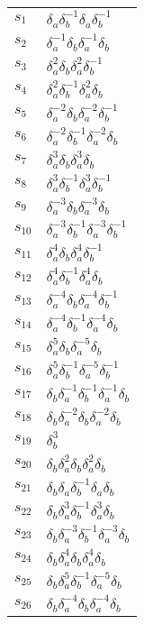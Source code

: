 \documentclass{article}
\begin{document}
\begin{center}
\begin{tabular}{ll}
\midrule
$s_{1}$ & $\delta_a^{}\delta_b^{-1}\delta_a^{}\delta_b^{-1}$ \\
$s_{2}$ & $\delta_a^{-1}\delta_b^{}\delta_a^{-1}\delta_b^{}$ \\
$s_{3}$ & $\delta_a^{2}\delta_b^{}\delta_a^{2}\delta_b^{-1}$ \\
$s_{4}$ & $\delta_a^{2}\delta_b^{-1}\delta_a^{2}\delta_b^{}$ \\
$s_{5}$ & $\delta_a^{-2}\delta_b^{}\delta_a^{-2}\delta_b^{-1}$ \\
$s_{6}$ & $\delta_a^{-2}\delta_b^{-1}\delta_a^{-2}\delta_b^{}$ \\
$s_{7}$ & $\delta_a^{3}\delta_b^{}\delta_a^{3}\delta_b^{}$ \\
$s_{8}$ & $\delta_a^{3}\delta_b^{-1}\delta_a^{3}\delta_b^{-1}$ \\
$s_{9}$ & $\delta_a^{-3}\delta_b^{}\delta_a^{-3}\delta_b^{}$ \\
$s_{10}$ & $\delta_a^{-3}\delta_b^{-1}\delta_a^{-3}\delta_b^{-1}$ \\
$s_{11}$ & $\delta_a^{4}\delta_b^{}\delta_a^{4}\delta_b^{-1}$ \\
$s_{12}$ & $\delta_a^{4}\delta_b^{-1}\delta_a^{4}\delta_b^{}$ \\
$s_{13}$ & $\delta_a^{-4}\delta_b^{}\delta_a^{-4}\delta_b^{-1}$ \\
$s_{14}$ & $\delta_a^{-4}\delta_b^{-1}\delta_a^{-4}\delta_b^{}$ \\
$s_{15}$ & $\delta_a^{5}\delta_b^{}\delta_a^{-5}\delta_b^{}$ \\
$s_{16}$ & $\delta_a^{5}\delta_b^{-1}\delta_a^{-5}\delta_b^{-1}$ \\
$s_{17}$ & $\delta_b^{}\delta_a^{-1}\delta_b^{-1}\delta_a^{-1}\delta_b^{}$ \\
$s_{18}$ & $\delta_b^{}\delta_a^{-2}\delta_b^{}\delta_a^{-2}\delta_b^{}$ \\
$s_{19}$ & $\delta_b^{3}$ \\
$s_{20}$ & $\delta_b^{}\delta_a^{2}\delta_b^{}\delta_a^{2}\delta_b^{}$ \\
$s_{21}$ & $\delta_b^{}\delta_a^{}\delta_b^{-1}\delta_a^{}\delta_b^{}$ \\
$s_{22}$ & $\delta_b^{}\delta_a^{3}\delta_b^{-1}\delta_a^{3}\delta_b^{}$ \\
$s_{23}$ & $\delta_b^{}\delta_a^{-3}\delta_b^{-1}\delta_a^{-3}\delta_b^{}$ \\
$s_{24}$ & $\delta_b^{}\delta_a^{4}\delta_b^{}\delta_a^{4}\delta_b^{}$ \\
$s_{25}$ & $\delta_b^{}\delta_a^{5}\delta_b^{-1}\delta_a^{-5}\delta_b^{}$ \\
$s_{26}$ & $\delta_b^{}\delta_a^{-4}\delta_b^{}\delta_a^{-4}\delta_b^{}$ \\
\bottomrule
\end{tabular}
\end{center}

\thispagestyle{empty}
\end{document}
